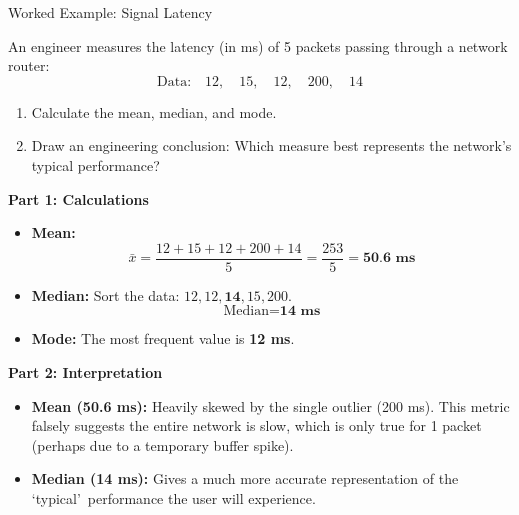 \begin{frame}[allowframebreaks]{Worked Example: Signal Latency}
    \begin{example}
        An engineer measures the latency (in ms) of 5 packets passing through a network router:
        \[ \text{Data:} \quad 12, \quad 15, \quad 12, \quad 200, \quad 14 \]
        
        \begin{enumerate}
            \item Calculate the mean, median, and mode.
            \item Draw an engineering conclusion: Which measure best represents the network's typical performance?
        \end{enumerate}
    \end{example}
    
    \pause
    
    \begin{solution}
        \textbf{Part 1: Calculations}
        \begin{itemize}
            \item \textbf{Mean:} 
            \[ \bar{x} = \frac{12+15+12+200+14}{5} = \frac{253}{5} = \textbf{50.6 ms} \]
            \item \textbf{Median:} Sort the data: $12, 12, \mathbf{14}, 15, 200$. 
            \[ \text{Median} = \textbf{14 ms} \]
            \item \textbf{Mode:} The most frequent value is \textbf{12 ms}.
        \end{itemize}
        \end{solution}
        \vspace{0.3cm}
        \begin{solutioncont}
        \textbf{Part 2: Interpretation}
        \begin{itemize}
            \item \textbf{Mean (50.6 ms):} Heavily skewed by the single outlier (200 ms). This metric falsely suggests the entire network is slow, which is only true for 1 packet (perhaps due to a temporary buffer spike).
            \item \textbf{Median (14 ms):} Gives a much more accurate representation of the \lq typical\rq\ performance the user will experience.
        \end{itemize}
    \end{solutioncont}
    

\end{frame}
